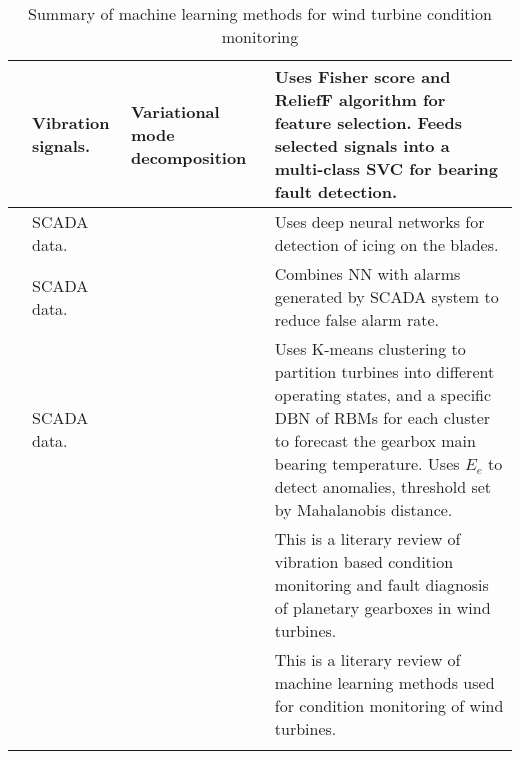 \begin{longtable}{p{}p{}p{}p{}}
    \cite{roller_bearings_cm_fisher_score_and_permutation_entropy} & Vibration signals. & Variational mode decomposition & Uses Fisher score and ReliefF algorithm for feature selection. Feeds selected signals into a multi-class SVC for bearing fault detection. \\ \hline
    \cite{deep_learning_for_imbalanced_class_detection_bearing_cm} & SCADA data. & & Uses deep neural networks for detection of icing on the blades. \\ \hline
    \cite{reliability_analysis_detecting_FA_NN_wt} & SCADA data. & & Combines NN with alarms generated by SCADA system to reduce false alarm rate. \\ \hline
    \cite{DBN_chicken_swarm_optim} & SCADA data. & & Uses K-means clustering to partition turbines into different operating states, and a specific DBN of RBMs for each cluster to forecast the gearbox main bearing temperature. Uses $E_e$ to detect anomalies, threshold set by Mahalanobis distance. \\ \hline
    \cite{vibration_fault_diagnosis_wt_planetary_gearbox} & & & This is a literary review of vibration based condition monitoring and fault diagnosis of planetary gearboxes in wind turbines. \\ \hline
    \cite{ml_for_wt_cond_monit_rev} & & & This is a literary review of machine learning methods used for condition monitoring of wind turbines. \\ \hline
    \hline
    \caption{Summary of machine learning methods for wind turbine condition monitoring}
    \label{tab:machine_learning_wt_cm_summary}
\end{longtable}